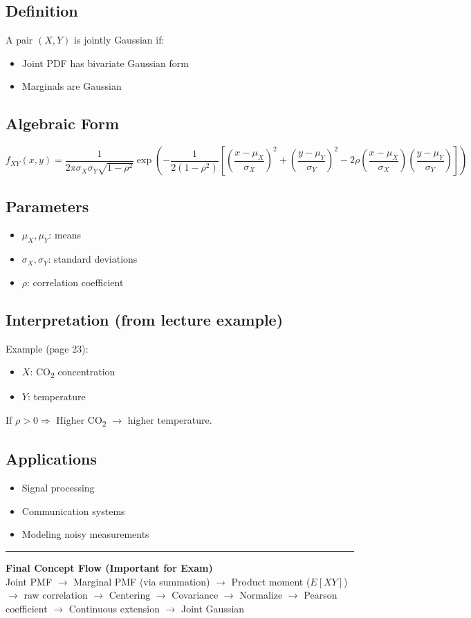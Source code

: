 \documentclass[12pt,a4paper]{article}
\begin{document}
\subsection{Definition}
A pair $(X,Y)$ is jointly Gaussian if:
\begin{itemize}
    \item Joint PDF has bivariate Gaussian form
    \item Marginals are Gaussian
\end{itemize}

\subsection{Algebraic Form}
\[
f_{XY}(x,y) =
\frac{1}{2\pi \sigma_X \sigma_Y \sqrt{1-\rho^2}}
\exp\left(
-\frac{1}{2(1-\rho^2)}
\left[
\left(\frac{x-\mu_X}{\sigma_X}\right)^2
+
\left(\frac{y-\mu_Y}{\sigma_Y}\right)^2
- 2\rho \left(\frac{x-\mu_X}{\sigma_X}\right)\left(\frac{y-\mu_Y}{\sigma_Y}\right)
\right]
\right)
\]

\subsection{Parameters}
\begin{itemize}
    \item $\mu_X, \mu_Y$: means
    \item $\sigma_X, \sigma_Y$: standard deviations
    \item $\rho$: correlation coefficient
\end{itemize}

\subsection{Interpretation (from lecture example)}
Example (page 23):
\begin{itemize}
    \item $X$: CO\textsubscript{2} concentration
    \item $Y$: temperature
\end{itemize}
If $\rho > 0 \Rightarrow$ Higher CO\textsubscript{2} $\rightarrow$ higher temperature.

\subsection{Applications}
\begin{itemize}
    \item Signal processing
    \item Communication systems
    \item Modeling noisy measurements
\end{itemize}

\vspace{1em}
\hrule
\vspace{1em}
\noindent \textbf{Final Concept Flow (Important for Exam)} \\
Joint PMF $\rightarrow$ Marginal PMF (via summation) $\rightarrow$ Product moment ($E[XY]$) $\rightarrow$ raw correlation $\rightarrow$ Centering $\rightarrow$ Covariance $\rightarrow$ Normalize $\rightarrow$ Pearson coefficient $\rightarrow$ Continuous extension $\rightarrow$ Joint Gaussian
\end{document}
